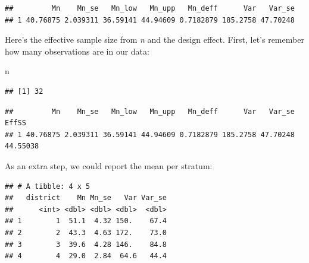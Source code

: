 \documentclass[
]{article}
\newenvironment{Shaded}{\begin{snugshade}}{\end{snugshade}}
\newcommand{\DataTypeTok}[1]{\textcolor[rgb]{0.13,0.29,0.53}{#1}}
\newcommand{\KeywordTok}[1]{\textcolor[rgb]{0.13,0.29,0.53}{\textbf{#1}}}
\newcommand{\NormalTok}[1]{#1}
\newcommand{\OperatorTok}[1]{\textcolor[rgb]{0.81,0.36,0.00}{\textbf{#1}}}
\newcommand{\StringTok}[1]{\textcolor[rgb]{0.31,0.60,0.02}{#1}}
\begin{document}
\begin{verbatim}
##         Mn    Mn_se   Mn_low   Mn_upp   Mn_deff      Var   Var_se
## 1 40.76875 2.039311 36.59141 44.94609 0.7182879 185.2758 47.70248
\end{verbatim}

Here's the effective sample size from \emph{n} and the design effect.
First, let's remember how many observations are in our data:

\begin{Shaded}
\begin{Highlighting}[]
\NormalTok{n}
\end{Highlighting}
\end{Shaded}

\begin{verbatim}
## [1] 32
\end{verbatim}

\begin{Shaded}
\end{Shaded}

\begin{verbatim}
##         Mn    Mn_se   Mn_low   Mn_upp   Mn_deff      Var   Var_se    EffSS
## 1 40.76875 2.039311 36.59141 44.94609 0.7182879 185.2758 47.70248 44.55038
\end{verbatim}

As an extra step, we could report the mean per stratum:

\begin{Shaded}
\end{Shaded}

\begin{verbatim}
## # A tibble: 4 x 5
##   district    Mn Mn_se   Var Var_se
##      <int> <dbl> <dbl> <dbl>  <dbl>
## 1        1  51.1  4.32 150.    67.4
## 2        2  43.3  4.63 172.    73.0
## 3        3  39.6  4.28 146.    84.8
## 4        4  29.0  2.84  64.6   44.4
\end{verbatim}
\end{document}
